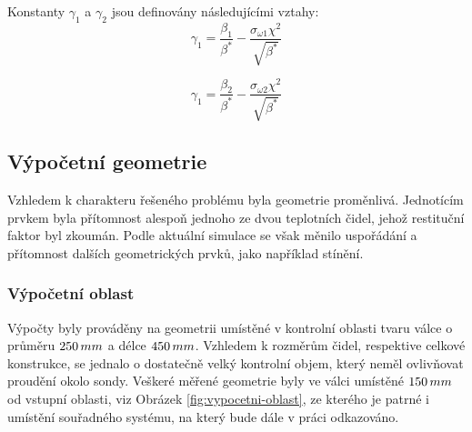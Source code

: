         \noindent Konstanty $\gamma _1$ a $\gamma _2$ jsou definovány následujícími vztahy:
        \begin{equation}
            \gamma _1 = \frac{\beta _1}{\beta ^*} - \frac{\sigma _{\omega 1} \chi ^2}{\sqrt{\beta ^*}}
        \end{equation}

        \begin{equation}
            \gamma _1 = \frac{\beta _2}{\beta ^*} - \frac{\sigma _{\omega 2} \chi ^2}{\sqrt{\beta ^*}}
        \end{equation}

    \newpage
    \subsection{Výpočetní geometrie}
        Vzhledem k charakteru řešeného problému byla geometrie proměnlivá. Jednotícím prvkem byla přítomnost alespoň jednoho ze dvou teplotních čidel, jehož restituční faktor byl zkoumán. Podle aktuální simulace se však měnilo uspořádání a přítomnost dalších geometrických prvků, jako například stínění.
    
        \subsubsection{Výpočetní oblast}
            Výpočty byly prováděny na geometrii umístěné v kontrolní oblasti tvaru válce o průměru $250 \, mm$ a délce $450 \, mm$. Vzhledem k rozměrům čidel, respektive celkové konstrukce, se jednalo o dostatečně velký kontrolní objem, který neměl ovlivňovat proudění okolo sondy. Veškeré měřené geometrie byly ve válci umístěné $150 \, mm$ od vstupní oblasti, viz Obrázek \ref{fig:vypocetni-oblast}, ze kterého je patrné i umístění souřadného systému, na který bude dále v práci odkazováno.
            
